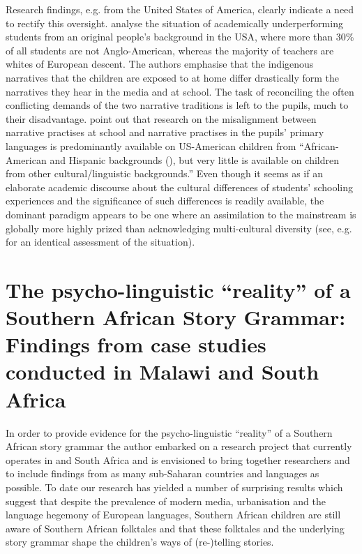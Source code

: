 \documentclass[output=paper,modfonts]{langscibook}
\begin{document}
Research findings, e.g. from the United States of America, clearly indicate a need to rectify this oversight. \citet{Westby2002} analyse the situation of academically underperforming students from an original people’s background in the USA, where more than 30\% of all students are not Anglo-American, whereas the majority of teachers are whites of European descent. The authors emphasise that the indigenous narratives that the children are exposed to at home differ drastically form the narratives they hear in the media and at school. The task of reconciling the often conflicting demands of the two narrative traditions is left to the pupils, much to their disadvantage. \citet[238]{Westby2002} point out that research on the misalignment between narrative practises at school and narrative practises in the pupils’ primary languages is predominantly available on US-American children from “African-American and Hispanic backgrounds (\citealt{Gee1989,Gutierrez-Clellen1995,Hester1996,HyterWestby1996,LabovWaletzky1967,Shuman1986storytelling}), but very little is available on children from other cultural/linguistic backgrounds.” Even though it seems as if an elaborate academic discourse about the cultural differences of students’ schooling experiences and the significance of such differences is readily available, the dominant paradigm appears to be one where an assimilation to the mainstream is globally more highly prized than acknowledging multi-cultural diversity (see, e.g. \citealt{Souto-Manning2013} for an identical assessment of the situation).


\section{The psycho-linguistic “reality” of a Southern African Story Grammar: Findings from case studies conducted in Malawi and South Africa}\label{sec:tappe:4}


In order to provide evidence for the psycho-linguistic “reality” of a Southern African story grammar the author embarked on a research project that currently operates in  and South Africa and is envisioned to bring together researchers and to include findings from as many sub-Saharan countries and languages as possible. To date our research has yielded a number of surprising results which suggest that despite the prevalence of modern media, urbanisation and the language hegemony of European languages, Southern African children are still aware of Southern African folktales and that these folktales and the underlying story grammar shape the children’s ways of (re-)telling stories.
\end{document}
